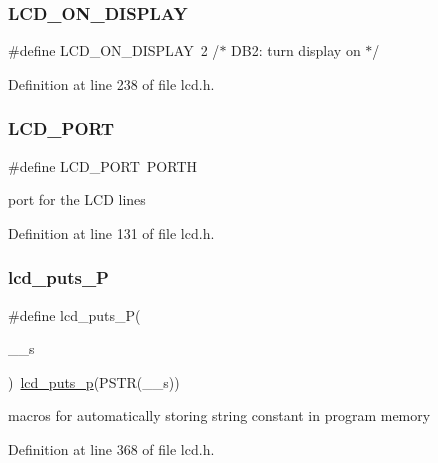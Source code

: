 \subsubsection{\texorpdfstring{LCD\_ON\_DISPLAY}{LCD\_ON\_DISPLAY}}
{\footnotesize\ttfamily \#define L\+C\+D\+\_\+\+O\+N\+\_\+\+D\+I\+S\+P\+L\+AY~2      /$\ast$   D\+B2\+: turn display on              $\ast$/}



Definition at line 238 of file lcd.\+h.

\mbox{\label{group__pfleury__lcd_gabcf42bd88b3c36193f301ca25b033875}} 
\subsubsection{\texorpdfstring{LCD\_PORT}{LCD\_PORT}}
{\footnotesize\ttfamily \#define L\+C\+D\+\_\+\+P\+O\+RT~P\+O\+R\+TH}

port for the L\+CD lines 

Definition at line 131 of file lcd.\+h.

\mbox{\label{group__pfleury__lcd_ga4f1928f1515e21422d5a33af2949f2f7}} 
\subsubsection{\texorpdfstring{lcd\_puts\_P}{lcd\_puts\_P}}
{\footnotesize\ttfamily \#define lcd\+\_\+puts\+\_\+P(\begin{DoxyParamCaption}\item[{}]{\+\_\+\+\_\+s }\end{DoxyParamCaption})~\mbox{\hyperlink{group__pfleury__lcd_ga9022a24a56a9b15681f62eb6ba77e5de}{lcd\+\_\+puts\+\_\+p}}(P\+S\+TR(\+\_\+\+\_\+s))}



macros for automatically storing string constant in program memory 



Definition at line 368 of file lcd.\+h.

\mbox{\label{group__pfleury__lcd_gae5c0a0a5750f3aaea06083e3a4a31f5d}} 
